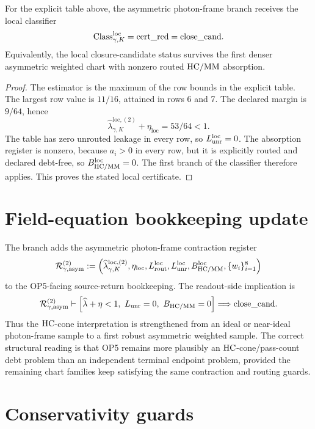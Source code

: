 \begin{proposition}
For the explicit table above, the asymmetric photon-frame branch receives the local classifier
\[
\mathrm{Class}_{\gamma,K}^{\mathrm{loc}}=\mathrm{cert\_red}=\mathrm{close\_cand}.
\]
Equivalently, the local closure-candidate status survives the first denser asymmetric weighted chart with nonzero routed \(\mathrm{HC}/\mathrm{MM}\) absorption.
\end{proposition}

\begin{proof}
The estimator is the maximum of the row bounds in the explicit table. The largest row value is \(11/16\), attained in rows 6 and 7. The declared margin is \(9/64\), hence
\[
\widehat\lambda_{\gamma,K}^{\mathrm{loc},(2)}+\eta_{\mathrm{loc}}=53/64<1.
\]
The table has zero unrouted leakage in every row, so \(L_{\mathrm{unr}}^{\mathrm{loc}}=0\). The absorption register is nonzero, because \(a_i>0\) in every row, but it is explicitly routed and declared debt-free, so \(B_{\mathrm{HC}/\mathrm{MM}}^{\mathrm{loc}}=0\). The first branch of the classifier therefore applies. This proves the stated local certificate.
\end{proof}

\section{Field-equation bookkeeping update}

The branch adds the asymmetric photon-frame contraction register
\[
\mathcal R_{\gamma,\mathrm{asym}}^{(2)}
:=
\left(
\widehat\lambda_{\gamma,K}^{\mathrm{loc},(2)},
\eta_{\mathrm{loc}},
L_{\mathrm{rout}}^{\mathrm{loc}},
L_{\mathrm{unr}}^{\mathrm{loc}},
B_{\mathrm{HC}/\mathrm{MM}}^{\mathrm{loc}},
\{w_i\}_{i=1}^{8}
\right)
\]
to the OP5-facing source-return bookkeeping. The readout-side implication is
\[
\mathcal R_{\gamma,\mathrm{asym}}^{(2)}
\vdash
\left[
\widehat\lambda+\eta<1,
\ L_{\mathrm{unr}}=0,
\ B_{\mathrm{HC}/\mathrm{MM}}=0
\right]
\Longrightarrow
\mathrm{close\_cand}.
\]
Thus the \(\mathrm{HC}\)-cone interpretation is strengthened from an ideal or near-ideal photon-frame sample to a first robust asymmetric weighted sample. The correct structural reading is that OP5 remains more plausibly an \(\mathrm{HC}\)-cone/pass-count debt problem than an independent terminal endpoint problem, provided the remaining chart families keep satisfying the same contraction and routing guards.

\section{Conservativity guards}

